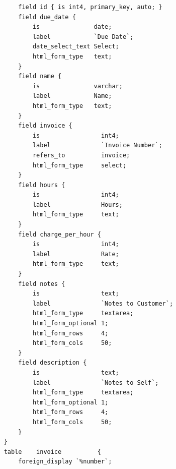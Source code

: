 \begin{verbatim}
        field id { is int4, primary_key, auto; }
        field due_date {
            is               date;
            label            `Due Date`;
            date_select_text Select;
            html_form_type   text;
        }
        field name {
            is               varchar;
            label            Name;
            html_form_type   text;
        }
        field invoice {
            is                 int4;
            label              `Invoice Number`;
            refers_to          invoice;
            html_form_type     select;
        }
        field hours {
            is                 int4;
            label              Hours;
            html_form_type     text;
        }
        field charge_per_hour {
            is                 int4;
            label              Rate;
            html_form_type     text;
        }
        field notes {
            is                 text;
            label              `Notes to Customer`;
            html_form_type     textarea;
            html_form_optional 1;
            html_form_rows     4;
            html_form_cols     50;
        }
        field description {
            is                 text;
            label              `Notes to Self`;
            html_form_type     textarea;
            html_form_optional 1;
            html_form_rows     4;
            html_form_cols     50;
        }
    }
    table    invoice          {
        foreign_display `%number`;


\end{verbatim}

